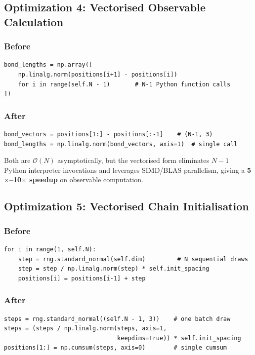 \documentclass[12pt,a4paper]{article}
\newcommand{\Obig}[1]{\mathcal{O}\!\left(#1\right)}
\begin{document}
\subsection{Optimization 4: Vectorised Observable Calculation}
\label{sec:vec-obs}

\subsubsection{Before}
\begin{lstlisting}[caption={Original Python loop for bond lengths.}]
bond_lengths = np.array([
    np.linalg.norm(positions[i+1] - positions[i])
    for i in range(self.N - 1)       # N-1 Python function calls
])
\end{lstlisting}

\subsubsection{After}
\begin{lstlisting}[caption={Vectorised bond lengths — single BLAS call.}]
bond_vectors = positions[1:] - positions[:-1]    # (N-1, 3)
bond_lengths = np.linalg.norm(bond_vectors, axis=1)  # single call
\end{lstlisting}

Both are $\Obig{N}$ asymptotically, but the vectorised form eliminates
$N-1$ Python interpreter invocations and leverages SIMD/BLAS parallelism,
giving a \textbf{5$\times$--10$\times$ speedup} on observable computation.

\subsection{Optimization 5: Vectorised Chain Initialisation}
\label{sec:vec-init}

\subsubsection{Before}
\begin{lstlisting}[caption={Original sequential random-walk init.}]
for i in range(1, self.N):
    step = rng.standard_normal(self.dim)         # N sequential draws
    step = step / np.linalg.norm(step) * self.init_spacing
    positions[i] = positions[i-1] + step
\end{lstlisting}

\subsubsection{After}
\begin{lstlisting}[caption={Vectorised random-walk init.}]
steps = rng.standard_normal((self.N - 1, 3))    # one batch draw
steps = (steps / np.linalg.norm(steps, axis=1,
                                keepdims=True)) * self.init_spacing
positions[1:] = np.cumsum(steps, axis=0)        # single cumsum
\end{lstlisting}
\end{document}
